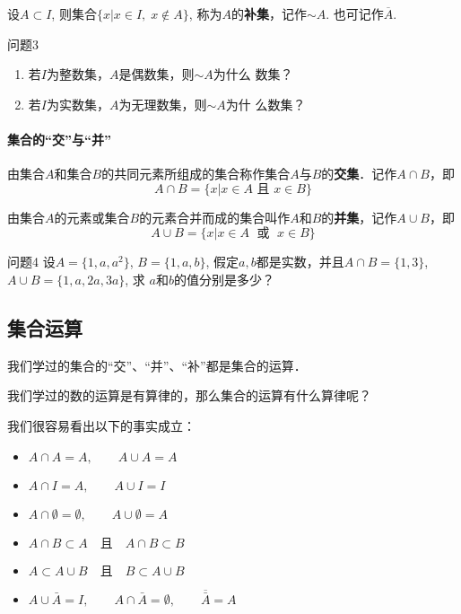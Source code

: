 设$A\subset I$, 则集合$\{x|x\in I,\; x\notin A\}$, 称为$A$的\textbf{补集}，记作$\sim A$. 也可记作$\overline{A}$.

\begin{blk}{问题3}
\begin{enumerate}
    \item 若$I$为整数集，$A$是偶数集，则$\sim A$为什么
数集？
\item 若$I$为实数集，$A$为无理数集，则$\sim A$为什
么数集？
\end{enumerate}
\end{blk}

\paragraph{集合的“交”与“并”}

由集合$A$和集合$B$的共同元素所组成的集合称作集合$A$与$B$的\textbf{交集}．记作$A\cap B$，即
\[A\cap B=\{x|x\in A\text{ 且 }x\in B\}\]

由集合$A$的元素或集合$B$的元素合并而成的集合叫作$A$和$B$的\textbf{并集}，记作$A\cup B$，即
\[A\cup B=\{x|x\in A\; \text{ 或 }\; x\in B\}\]

\begin{blk}{问题4}
    设$A=\{1,a,a^2\}$, $B=\{1,a,b\}$, 假定$a,b$都是实数，并且$A\cap B=\{1, 3\}$, $A\cup B=\{1,a,2a,3a\}$, 求
$a$和$b$的值分别是多少？
\end{blk}


\subsection{集合运算}

我们学过的集合的“交”、“并”、“补”都是集合的运算．

我们学过的数的运算是有算律的，那么集合的运算有什么算律呢？

我们很容易看出以下的事实成立：

\begin{blk}{}
\begin{itemize}
    \item $    A\cap A=A,\qquad     A\cup A=A$
\item $    A\cap I=A,\qquad    A\cup I=I$
\item $    A\cap \emptyset=\emptyset,\qquad  A\cup \emptyset=A$
\item $    A\cap B\subset A \quad \text{且}\quad A\cap B\subset B$
\item $A\subset A\cup B \quad \text{且}\quad B\subset A\cup B$
\item $A\cup \bar{A}=I,\qquad A\cap \bar{A}=\emptyset,\qquad \overline{\bar{A}}=A$    
\end{itemize}
\end{blk}

